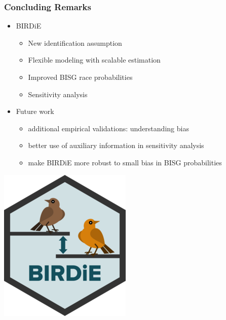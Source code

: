 \documentclass[handout]{beamer}
\begin{document}
\begin{frame}

  \frametitle{Concluding Remarks}

  \begin{itemize}
  \item BIRDiE
    \begin{itemize}
    \item New identification assumption
    \item Flexible modeling with scalable estimation
    \item Improved BISG race probabilities
    \item Sensitivity analysis
    \end{itemize}
    \vfill

  \item Future work
    \begin{itemize}
    \item additional empirical validations: understanding bias
    \item better use of auxiliary information in sensitivity analysis
    \item make BIRDiE more robust to small bias in BISG probabilities

    \end{itemize}
  \end{itemize}

  \vfill
  \vspace{-.7in}
  \begin{flushright}
     \includegraphics[scale=0.165]{../man/figures/logo.png}
  \end{flushright}
\end{frame}
\end{document}
